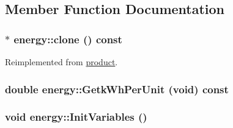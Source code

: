 \subsection{Member Function Documentation}
\hypertarget{classenergy_a42dce7e281e54a333e65e3ca826c90ac}{
\subsubsection[{clone}]{ $\ast$ energy::clone () const}}
\label{classenergy_a42dce7e281e54a333e65e3ca826c90ac}


Reimplemented from \hyperlink{classproduct_a18a1df87f3400774db21d1e8c573f04a}{product}.\hypertarget{classenergy_a61157b46f4f7115eb34238d944a33fe4}{
\subsubsection[{GetkWhPerUnit}]{\setlength{\rightskip}{0pt plus 5cm}double energy::GetkWhPerUnit (void) const}}
\label{classenergy_a61157b46f4f7115eb34238d944a33fe4}
\hypertarget{classenergy_aa993052d14ca60cbce1b89ff2e312d16}{
\subsubsection[{InitVariables}]{\setlength{\rightskip}{0pt plus 5cm}void energy::InitVariables ()}}
\label{classenergy_aa993052d14ca60cbce1b89ff2e312d16}


